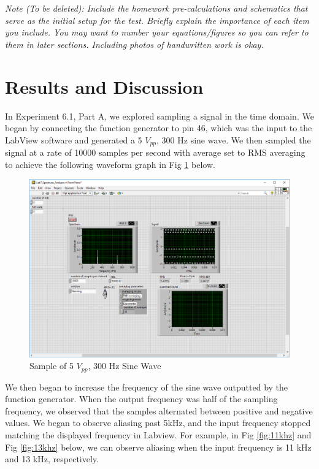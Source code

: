 \documentclass[10pt]{article}
\begin{document}
\medskip

\textit{Note (To be deleted): Include the homework pre-calculations and schematics that serve as the initial setup for the test. Briefly explain the importance of each item you include. You may want to number your equations/figures so you can refer to them in later sections. Including photos of handwritten work is okay.}

\section{Results and Discussion}

In Experiment 6.1, Part A, we explored sampling a signal in the time domain. We began by connecting the function generator to pin 46, which was the input to the LabView software and generated a 5 $V_{pp}$, 300 Hz sine wave. We then sampled the signal at a rate of 10000 samples per second with average set to RMS averaging to achieve the following waveform graph in Fig \ref{fig:firstsample} below. 

\begin{centering}
	\begin{figure} [H]
		\centering
		\includegraphics[scale=0.22]{images/61a2khzsample.PNG}
		\caption{Sample of 5 $V_{pp}$, 300 Hz Sine Wave}
		\label{fig:firstsample}
	\end{figure}
\end{centering}

We then began to increase the frequency of the sine wave outputted by the function generator. When the output frequency was half of the sampling frequency, we observed that the samples alternated between positive and negative values. We began to observe aliasing past 5kHz, and the input frequency stopped matching the displayed frequency in Labview. For example, in Fig \ref{fig:11khz} and Fig \ref{fig:13khz} below, we can observe aliasing when the input frequency is 11 kHz and 13 kHz, respectively. 
\end{document}
